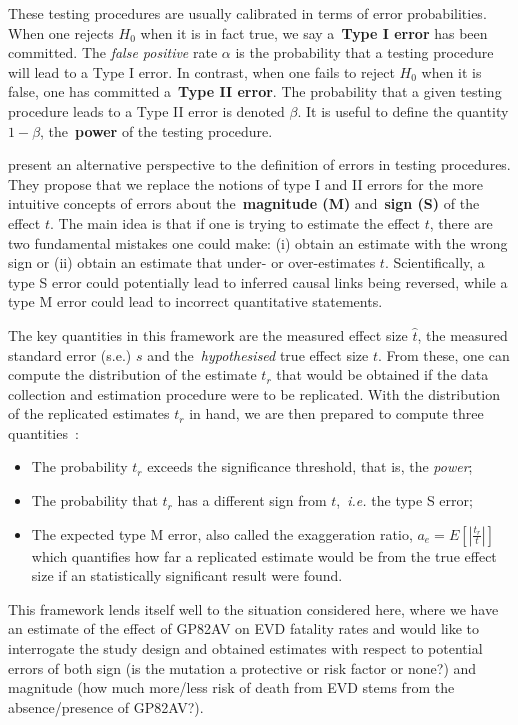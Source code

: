 These testing procedures are usually calibrated in terms of error probabilities.
When one rejects $H_0$ when it is in fact true, we say a~\textbf{Type I error}  has been committed.
The \textit{false positive} rate $\alpha$ is the probability that a testing procedure will lead to a Type I error.
In contrast, when one fails to reject $H_0$ when it is false, one has committed a~\textbf{Type II error}.
The probability that a given testing procedure leads to a Type II error is denoted $\beta$.
It is useful to define the quantity $1-\beta$, the~\textbf{power} of the testing procedure.

\cite{Gelman2014} present an alternative perspective to the definition of errors in testing procedures.
They propose that we replace the notions of type I and II errors for the more intuitive concepts of errors about the~\textbf{magnitude (M)} and~\textbf{sign (S)} of the effect $t$.
The main idea is that if one is trying to estimate the effect $t$, there are two fundamental mistakes one could make: (i) obtain an estimate with the wrong sign or (ii) obtain an estimate that under- or over-estimates $t$.
Scientifically, a type S error could potentially lead to inferred causal links being reversed, while a type M error could lead to incorrect quantitative statements.

The key quantities in this framework are the measured effect size $\hat{t}$, the measured standard error (s.e.) $s$ and the~\textit{hypothesised} true effect size $t$.
From these, one can compute the distribution of the estimate $t_r$  that would be  obtained if the data collection and estimation procedure were to be replicated. 
With the distribution of the replicated estimates $t_r$ in hand, we are then prepared to compute three quantities~\citep{Gelman2014}:
\begin{itemize}
 \item The probability $t_r$ exceeds the significance threshold, that is, the \textit{power};
 \item The probability that $t_r$ has a different sign from $t$,~\textit{i.e.} the type S error;
 \item The expected type M error, also called the exaggeration ratio, $a_e = E[|\frac{t_r}{t}|]$ which quantifies how far a replicated estimate would be from the true effect size if an statistically significant result were found. 
\end{itemize}

This framework lends itself well to the situation considered here, where we have an estimate of the effect of GP82AV on EVD fatality rates and would like to interrogate the study design and obtained estimates with respect to potential errors of both sign (is the mutation a protective or risk factor or none?) and magnitude (how much more/less risk of death from EVD stems from the absence/presence of GP82AV?).

